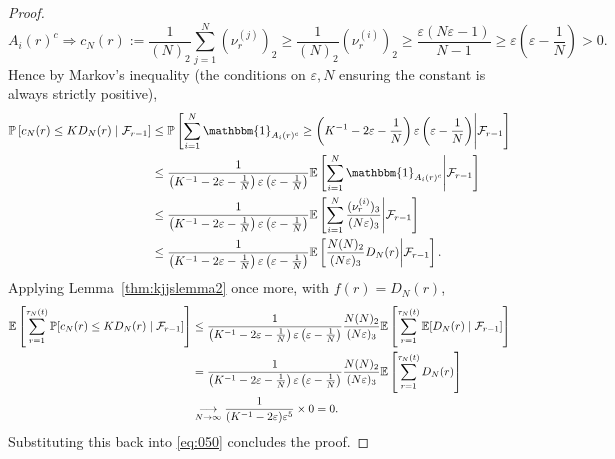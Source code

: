 \documentclass{article}
\newcommand{\Prob}{\mathbb{P}}
\newcommand{\E}{\mathbb{E}}
\newcommand{\1}[1]{\mathbbm{1}_{#1}}
\begin{document}
\begin{proof}
\begin{equation}
A_i(r)^c 
\Rightarrow c_N(r) 
:= \frac{1}{(N)_2} \sum_{j=1}^N (\nu_r^{(j)})_2
\geq \frac{1}{(N)_2} (\nu_r^{(i)})_2
\geq \frac{\varepsilon (N\varepsilon-1)}{N-1}
\geq \varepsilon \left( \varepsilon - \frac{1}{N} \right)
>0 .
\end{equation}
Hence by Markov's inequality (the conditions on $\varepsilon, N$ ensuring the constant is always strictly positive),
\begin{align}
\Prob\left[ c_N(r) \leq K D_N(r) \mid \mathcal{F}_{r-1} \right]
&\leq \Prob\left[ \sum_{i=1}^N \1{A_i(r)^c} \geq 
        \left( K^{-1} - 2\varepsilon- \frac{1}{N} \right) \varepsilon 
        \left( \varepsilon-\frac{1}{N} \right) 
        \middle| \mathcal{F}_{r-1} \right] \notag\\
&\leq \frac{1}{\left( K^{-1} - 2\varepsilon- \frac{1}{N} \right) \varepsilon 
        \left( \varepsilon-\frac{1}{N} \right)} 
        \E\left[ \sum_{i=1}^N \1{A_i(r)^c} 
        \middle| \mathcal{F}_{r-1} \right] \notag\\
&\leq \frac{1}{\left( K^{-1} - 2\varepsilon- \frac{1}{N} \right) \varepsilon 
        \left( \varepsilon-\frac{1}{N} \right)} 
        \E\left[ \sum_{i=1}^N \frac{(\nu_r^{(i)})_3}{(N\varepsilon)_3}
        \middle| \mathcal{F}_{r-1} \right] \notag\\
&\leq \frac{1}{\left( K^{-1} - 2\varepsilon- \frac{1}{N} \right) \varepsilon 
        \left( \varepsilon-\frac{1}{N} \right)} 
        \E\left[ \frac{N(N)_2}{(N\varepsilon)_3} D_N(r)
        \middle| \mathcal{F}_{r-1} \right] .
\end{align}
Applying Lemma~\ref{thm:kjjslemma2} once more, with $f(r) = D_N(r)$,
\begin{align}
\E \left[ \sum_{r=1}^{\tau_N(t)} \Prob[ c_N(r) \leq K D_N(r) 
        \mid \mathcal{F}_{r-1} ] \right]
&\leq \frac{1}{\left( K^{-1} - 2\varepsilon- \frac{1}{N} \right) \varepsilon 
        \left( \varepsilon-\frac{1}{N} \right)} \frac{N(N)_2}{(N\varepsilon)_3}
        \E\left[ \sum_{r=1}^{\tau_N(t)} \E[ D_N(r) 
        \mid \mathcal{F}_{r-1} ] \right] \notag\\
&= \frac{1}{\left( K^{-1} - 2\varepsilon- \frac{1}{N} \right) \varepsilon 
        \left( \varepsilon-\frac{1}{N} \right)} \frac{N(N)_2}{(N\varepsilon)_3}
        \E\left[ \sum_{r=1}^{\tau_N(t)} D_N(r) \right] \notag\\
&\underset{N\to\infty}{\longrightarrow} 
        \frac{1}{(K^{-1} - 2\varepsilon)\varepsilon^5} \times0
=0 .
\end{align}
Substituting this back into \eqref{eq:050} concludes the proof.
\end{proof}
\end{document}
